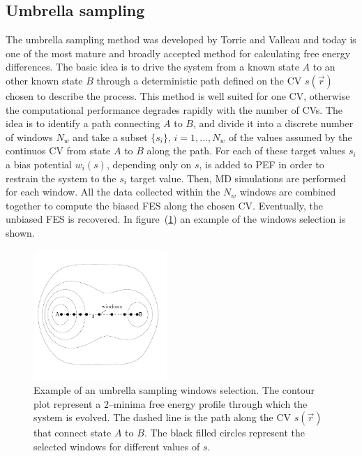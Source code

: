 \subsection{Umbrella sampling}
The umbrella sampling method was developed by Torrie and Valleau and today is one of the most mature and broadly
accepted method for calculating free energy differences. The basic idea is to drive the system from a known state
$A$ to an other known state $B$ through a deterministic path defined on the \ac{CV} $s(\vec r)$ chosen to
describe the process. This method is well suited for one \ac{CV}, otherwise the computational performance
degrades rapidly with the number of \acp{CV}. The idea is to identify a path connecting $A$ to $B$, and divide it
into a discrete number of windows $N_w$ and take a subset $\{s_i\}$, $i=1,\dots,N_w$ of the values assumed by the
continuos \ac{CV} from state $A$ to $B$ along the path. For each of these target values $s_i$ a bias potential
$w_i(s)$, depending only on $s$, is added to \ac{PEF} in order to restrain the system to the $s_i$ target value.
Then, \ac{MD} simulations are performed for each window. All the data collected within the $N_w$ windows are
combined together to compute the biased \ac{FES} along the chosen \ac{CV}. Eventually, the unbiased \ac{FES} is
recovered. In figure~(\ref{fig:umbrellaPath}) an example of the windows selection is shown.
\begin{figure}
	\centering
	\includegraphics[width=0.45\textwidth]{./img/umbrellaPath/umbrellaPath.pdf}
	\caption{Example of an umbrella sampling windows selection. The contour plot represent a $2$--minima free energy profile through which the system is evolved. The dashed line is the path along the \acs{CV} $s(\vec r)$ that connect state $A$ to $B$. The black filled circles represent the selected windows for different values of $s$.}
	\label{fig:umbrellaPath}
\end{figure}

